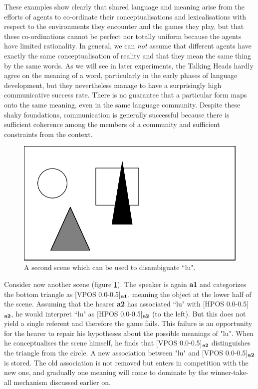 These examples show clearly that shared language and meaning 
arise from the efforts of agents to co-ordinate their
conceptualisations and lexicalisations with respect 
to the environments they encounter and the games they play, 
but that these co-ordinations cannot be perfect nor totally 
uniform because the agents have limited rationality. 
In general, we can {\it not} assume that different agents
have exactly the same 
conceptualisation of reality and that they mean the same thing by 
the same words. As we will see in later experiments, the
Talking Heads hardly agree on the meaning of a word, particularly 
in the early phases of language development, but they 
nevertheless manage to have a surprisingly high communicative success
rate. There is no guarantee that a particular 
form maps onto the same meaning, even in the same language community.
Despite these shaky foundations, communication is generally 
successful because there is sufficient coherence among the members of 
a community and sufficient constraints from the context. 

\begin{figure}[htbp]
  \centerline{\includegraphics[width=.50\textwidth]{chap2/figs/scene1-2}}
\caption{\small\label{scene1-2} A second scene which 
can be used to disambiguate ``lu".}
\end{figure}
Consider now another scene (figure \ref{scene1-2}). The speaker
is again {\bf a1} and categorizes the bottom triangle as 
[VPOS 0.0-0.5]$_{\bf a1}$, meaning
the object at the lower half of the scene. Assuming that the
hearer {\bf a2} has associated ``lu" with [HPOS 0.0-0.5]$_{\bf a2}$, he
would interpret ``lu" as [HPOS 0.0-0.5]$_{\bf a2}$ (to the left). But this 
does not yield a single 
referent and therefore the game fails. 
This failure is an opportunity for the hearer to repair his 
hypotheses about the possible meanings of "lu".
When he conceptualises the scene himself, 
he finds that [VPOS 0.0-0.5]$_{\bf a2}$ distinguishes the triangle
from the circle. A new association between 
"lu" and [VPOS 0.0-0.5]$_{\bf a2}$ is stored. The old association
is not removed but enters in competition with the new
one, and gradually one meaning will come to dominate
by the winner-take-all mechanism discussed earlier on. 

